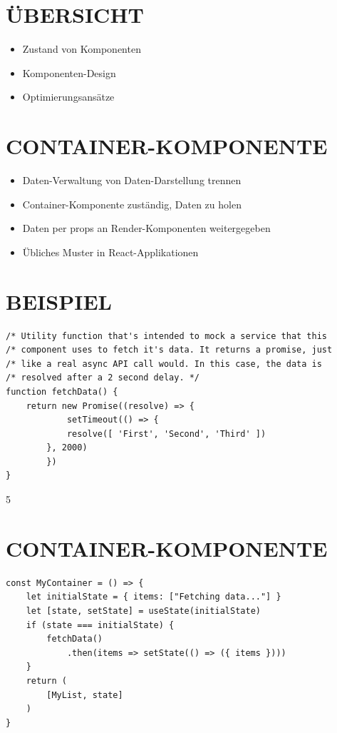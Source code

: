 \documentclass[10pt]{article}
\begin{document}
\section*{ÜBERSICHT}
\begin{itemize}
  \item Zustand von Komponenten
  \item Komponenten-Design
  \item Optimierungsansätze
\end{itemize}

\section*{CONTAINER-KOMPONENTE}
\begin{itemize}
  \item Daten-Verwaltung von Daten-Darstellung trennen
  \item Container-Komponente zuständig, Daten zu holen
  \item Daten per props an Render-Komponenten weitergegeben
  \item Übliches Muster in React-Applikationen
\end{itemize}

\section*{BEISPIEL}
\begin{verbatim}
/* Utility function that's intended to mock a service that this
/* component uses to fetch it's data. It returns a promise, just
/* like a real async API call would. In this case, the data is
/* resolved after a 2 second delay. */
function fetchData() {
    return new Promise((resolve) => {
            setTimeout(() => {
            resolve([ 'First', 'Second', 'Third' ])
        }, 2000)
        })
}
\end{verbatim}

5

\section*{CONTAINER-KOMPONENTE}
\begin{verbatim}
const MyContainer = () => {
    let initialState = { items: ["Fetching data..."] }
    let [state, setState] = useState(initialState)
    if (state === initialState) {
        fetchData()
            .then(items => setState(() => ({ items })))
    }
    return (
        [MyList, state]
    )
}
\end{verbatim}
\end{document}
